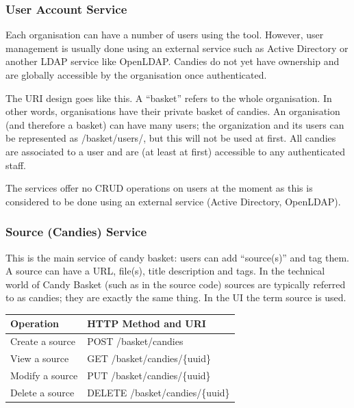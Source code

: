 \documentclass[letterpaper,10pt,english]{sphinxmanual}
\begin{document}
\subsubsection{User Account Service}
\label{developer-guide:user-account-service}
Each organisation can have a number of users using the tool. However,
user management is usually done using an external service such as
Active Directory or another LDAP service like OpenLDAP. Candies do not
yet have ownership and are globally accessible by the organisation
once authenticated.

The URI design goes like this. A ``basket'' refers to the whole
organisation. In other words, organisations have their private basket
of candies. An organisation (and therefore a basket) can have many
users; the organization and its users can be represented as
/basket/users/, but this will not be used at first. All candies are
associated to a user and are (at least at first) accessible to any
authenticated staff.

The services offer no CRUD operations on users at the moment as this
is considered to be done using an external service (Active Directory,
OpenLDAP).


\subsubsection{Source (Candies) Service}
\label{developer-guide:source-candies-service}
This is the main service of candy basket: users can add ``source(s)''
and tag them. A source can have a URL, file(s), title description and
tags. In the technical world of Candy Basket (such as in the source
code) sources are typically referred to as candies; they are exactly
the same thing. In the UI the term source is used.

\begin{tabulary}{\linewidth}{|L|L|}
\hline
\textsf{\relax 
Operation
} & \textsf{\relax 
HTTP Method and URI
}\\
\hline
Create a source
 & 
POST /basket/candies
\\

View a source
 & 
GET /basket/candies/\{uuid\}
\\

Modify a source
 & 
PUT /basket/candies/\{uuid\}
\\

Delete a source
 & 
DELETE /basket/candies/\{uuid\}
\\
\hline\end{tabulary}
\end{document}
